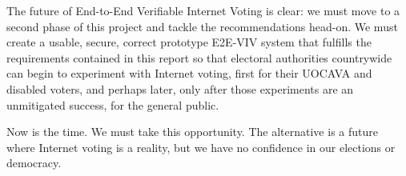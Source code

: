 The future of End-to-End Verifiable Internet Voting is clear: we must
move to a second phase of this project and tackle the recommendations
head-on.  We must create a usable, secure, correct prototype E2E-VIV
system that fulfills the requirements contained in this report so that
electoral authorities countrywide can begin to experiment with
Internet voting, first for their UOCAVA and disabled voters, and
perhaps later, only after those experiments are an unmitigated
success, for the general public.

Now is the time.  We must take this opportunity.  The alternative is a
future where Internet voting is a reality, but we have no confidence
in our elections or democracy.


